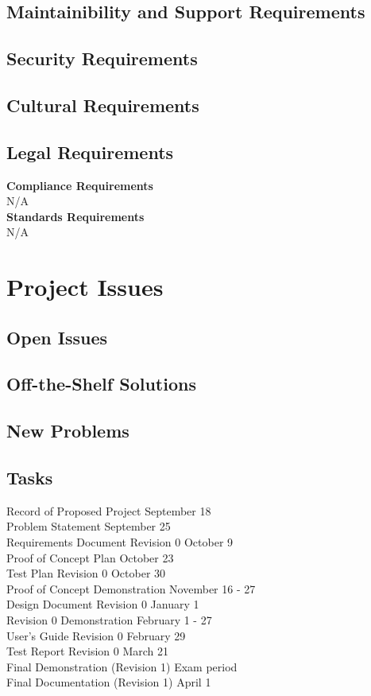 \documentclass[12pt]{article}
\begin{document}
\subsection{Maintainibility and Support Requirements} %
\subsection{Security Requirements} %
\subsection{Cultural Requirements} %
\subsection{Legal Requirements} %
\textbf{Compliance Requirements}\\
N/A\\
\textbf{Standards Requirements}\\
N/A\\
\section{Project Issues}
\subsection{Open Issues} %
\subsection{Off-the-Shelf Solutions} %
\subsection{New Problems} %
\subsection{Tasks} %

Record of Proposed Project 		\hfill 	September 18\\
Problem Statement			 	\hfill	September 25\\
Requirements Document Revision 0	\hfill	October 9\\
Proof of Concept Plan			\hfill	October 23\\
Test Plan Revision 0				\hfill	October 30\\
Proof of Concept Demonstration		\hfill	November 16 - 27\\
Design Document Revision 0		\hfill	January 1\\
Revision 0 Demonstration 			\hfill	February 1 -  27\\
User's Guide Revision 0			\hfill	February 29\\
Test Report Revision 0			\hfill	March 21\\
Final Demonstration (Revision 1)		\hfill	Exam period\\
Final Documentation (Revision 1)		\hfill	April 1
\end{document}
